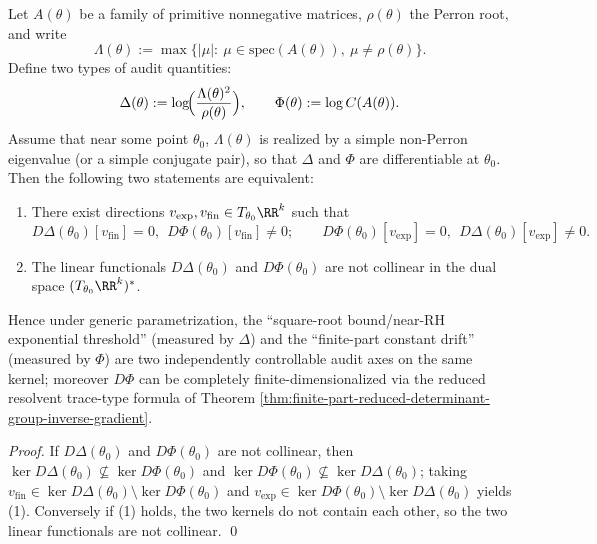 \begin{theorem}\label{thm:finite-part-exp-fin-double-threshold-separation}
Let \(A(\theta)\) be a family of primitive nonnegative matrices, \(\rho(\theta)\) the Perron root, and write
\[
\Lambda(\theta):=\max\{|\mu|:\ \mu\in\mathrm{spec}(A(\theta)),\ \mu\neq \rho(\theta)\}.
\]
Define two types of audit quantities:
\[
\Delta(\theta):=\log\!\Bigl(\frac{\Lambda(\theta)^2}{\rho(\theta)}\Bigr),
\qquad
\Phi(\theta):=\log C(A(\theta)).
\]
Assume that near some point \(\theta_0\), \(\Lambda(\theta)\) is realized by a simple non-Perron eigenvalue (or a simple conjugate pair), so that \(\Delta\) and \(\Phi\) are differentiable at \(\theta_0\).
Then the following two statements are equivalent:
\begin{enumerate}
  \item There exist directions \(v_{\mathrm{exp}},v_{\mathrm{fin}}\in T_{\theta_0}\RR^k\) such that
  \[
  D\Delta(\theta_0)[v_{\mathrm{fin}}]=0,\ \ D\Phi(\theta_0)[v_{\mathrm{fin}}]\neq 0;
  \qquad
  D\Phi(\theta_0)[v_{\mathrm{exp}}]=0,\ \ D\Delta(\theta_0)[v_{\mathrm{exp}}]\neq 0.
  \]
  \item The linear functionals \(D\Delta(\theta_0)\) and \(D\Phi(\theta_0)\) are not collinear in the dual space \((T_{\theta_0}\RR^k)^\ast\).
\end{enumerate}
Hence under generic parametrization, the ``square-root bound/near-RH exponential threshold'' (measured by \(\Delta\)) and the ``finite-part constant drift'' (measured by \(\Phi\)) are two independently controllable audit axes on the same kernel;
moreover \(D\Phi\) can be completely finite-dimensionalized via the reduced resolvent trace-type formula of Theorem \ref{thm:finite-part-reduced-determinant-group-inverse-gradient}.
\end{theorem}
\begin{proof}
If \(D\Delta(\theta_0)\) and \(D\Phi(\theta_0)\) are not collinear, then \(\ker D\Delta(\theta_0)\not\subseteq \ker D\Phi(\theta_0)\) and \(\ker D\Phi(\theta_0)\not\subseteq \ker D\Delta(\theta_0)\);
taking \(v_{\mathrm{fin}}\in \ker D\Delta(\theta_0)\setminus \ker D\Phi(\theta_0)\) and \(v_{\mathrm{exp}}\in \ker D\Phi(\theta_0)\setminus \ker D\Delta(\theta_0)\) yields (1).
Conversely if (1) holds, the two kernels do not contain each other, so the two linear functionals are not collinear. \qed
\end{proof}

